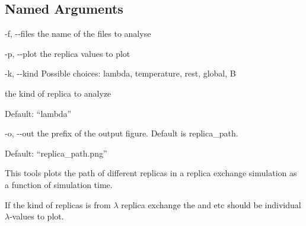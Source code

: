 \documentclass[letterpaper,10pt,english]{sphinxmanual}
\begin{document}
\subsection{Named Arguments}
\label{\detokenize{tools:Named Arguments}}\begin{optionlist}{3cm}
\item [-f, -{-}files]  
the name of the files to analyse
\item [-p, -{-}plot]  
the replica values to plot
\item [-k, -{-}kind]  
Possible choices: lambda, temperature, rest, global, B

the kind of replica to analyze

Default: “lambda”
\item [-o, -{-}out]  
the prefix of the output figure. Default is replica\_path.

Default: “replica\_path.png”
\end{optionlist}


%
\begin{sphinxVerbatim}[commandchars=\\\{\}]
     
        
        
\end{sphinxVerbatim}


This tools plots the path of different replicas in a replica exchange simulation as a function of simulation time.

If the kind of replicas is from \(\lambda\) replica exchange the  and  etc should be individual \(\lambda\)-values to plot.
\end{document}
